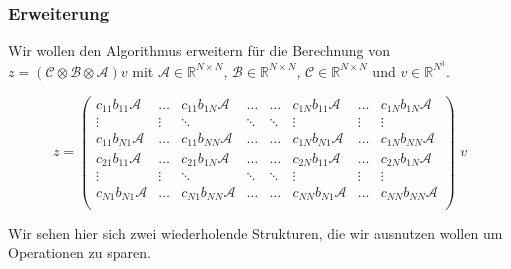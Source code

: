 \subsubsection{Erweiterung}
Wir wollen den Algorithmus erweitern für die Berechnung von $z=(\mathcal{C} \otimes \mathcal{B} \otimes \mathcal{A})v$ mit $\mathcal{A} \in \mathbb{R}^{N \times N}$, $\mathcal{B} \in \mathbb{R}^{N \times N}$, $\mathcal{C} \in \mathbb{R}^{N \times N}$ und $v \in \mathbb{R}^{N^3}$.


\begin{equation} z=
\begin{pmatrix}
c_{11} b_{11} \mathcal{A} & \dots  & c_{11} b_{1N} \mathcal{A} & \dots & \dots & c_{1N}b_{11}\mathcal{A} & \dots & c_{1N}b_{1N}\mathcal{A}  \\

\vdots & \vdots & \ddots & \ddots  & \ddots & \vdots & \vdots & \vdots \\
c_{11} b_{N 1} \mathcal{A} & \dots  & c_{11} b_{N N} \mathcal{A} & \dots & \dots & c_{1 N}b_{N 1}\mathcal{A} & \dots & c_{1 N}b_{N N}\mathcal{A}  \\
c_{21} b_{11} \mathcal{A} & \dots  & c_{21} b_{1N} \mathcal{A} & \dots & \dots & c_{2N}b_{11}\mathcal{A} & \dots & c_{2 N}b_{1 N}\mathcal{A}  \\
\vdots & \vdots & \ddots & \ddots  & \ddots & \vdots & \vdots & \vdots \\
c_{N 1} b_{N 1} \mathcal{A} & \dots  & c_{N 1} b_{N N} \mathcal{A} & \dots & \dots & c_{N N}b_{N 1}\mathcal{A} & \dots & c_{N N}b_{N N}\mathcal{A}  \\
\end{pmatrix} \, \, v
\end{equation}

Wir sehen hier sich zwei wiederholende Strukturen, die wir ausnutzen wollen um Operationen zu sparen.

